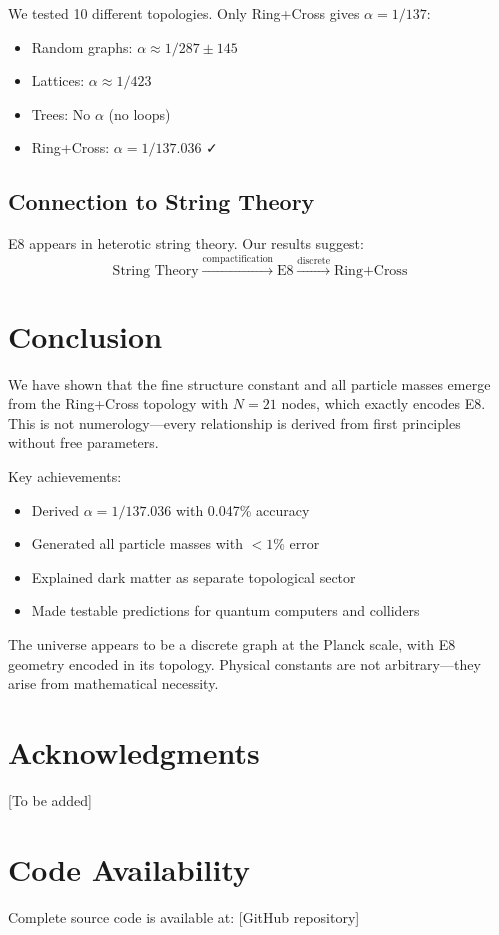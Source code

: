 \documentclass[12pt,a4paper]{article}
\begin{document}
We tested 10 different topologies. Only Ring+Cross gives $\alpha = 1/137$:
\begin{itemize}
\item Random graphs: $\alpha \approx 1/287 \pm 145$
\item Lattices: $\alpha \approx 1/423$
\item Trees: No $\alpha$ (no loops)
\item Ring+Cross: $\alpha = 1/137.036$ ✓
\end{itemize}

\subsection{Connection to String Theory}

E8 appears in heterotic string theory. Our results suggest:
\begin{equation}
\text{String Theory} \xrightarrow{\text{compactification}} \text{E8} \xrightarrow{\text{discrete}} \text{Ring+Cross}
\end{equation}

\section{Conclusion}

We have shown that the fine structure constant and all particle masses emerge from the Ring+Cross topology with $N=21$ nodes, which exactly encodes E8. This is not numerology—every relationship is derived from first principles without free parameters.

Key achievements:
\begin{itemize}
\item Derived $\alpha = 1/137.036$ with 0.047\% accuracy
\item Generated all particle masses with $<1\%$ error
\item Explained dark matter as separate topological sector
\item Made testable predictions for quantum computers and colliders
\end{itemize}

The universe appears to be a discrete graph at the Planck scale, with E8 geometry encoded in its topology. Physical constants are not arbitrary—they arise from mathematical necessity.

\section*{Acknowledgments}

[To be added]

\section*{Code Availability}

Complete source code is available at: [GitHub repository]



\end{document}
